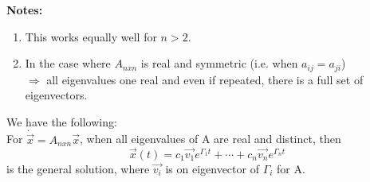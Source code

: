 \begin{enumerate}[label=\protect\circled{\Roman*}]
\begin{itemize}
\begin{itemize}
			\end{itemize}
		\end{itemize}
		\textbf{Notes: }
		\begin{enumerate}[label=\protect\circled{\arabic*}]
		\item This works equally well for $n > 2$.
		\item In the case where $A_{nxn}$ is real and symmetric (i.e. when $a_{ij} = a_{ji}$)\\
		$\Rightarrow$ all eigenvalues one real and even if repeated, there is a full set of eigenvectors.
		\end{enumerate}
		We have the following:\\
		For $\dot{\vec{x}} = A_{nxn} \vec{x}$, when all eigenvalues of A are real and distinct, then
		\begin{equation*}
			\vec{x}(t) = c_1\vec{v_1}e^{\Gamma_1 t} + \cdots + c_n\vec{v_n}e^{\Gamma_n t}
		\end{equation*}
		is the general solution, where $\vec{v_i}$ is on eigenvector of $\Gamma_i$ for A.
\end{enumerate}